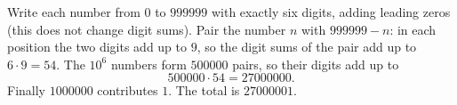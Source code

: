Write each number from $0$ to $999999$ with exactly six digits, adding leading zeros (this does not change digit sums). Pair the number $n$ with $999999-n$: in each position the two digits add up to $9$, so the digit sums of the pair add up to $6\cdot9=54$. The $10^6$ numbers form $500000$ pairs, so their digits add up to
\[500000\cdot54=27000000.\]
Finally $1000000$ contributes $1$. The total is $\boxed{27000001}$.

